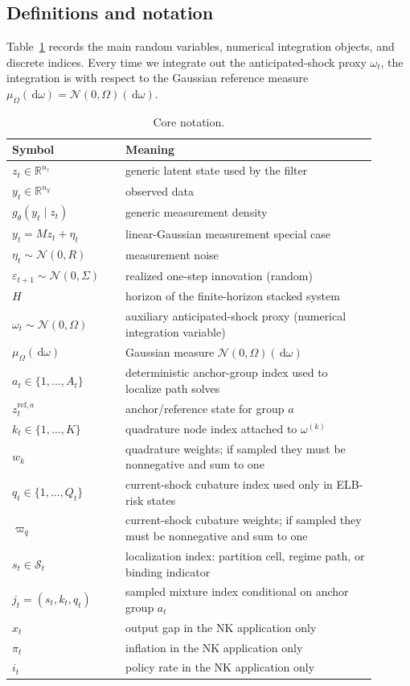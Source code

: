 \documentclass[11pt]{article}
\theoremstyle{remark}
\newcommand{\R}{\mathbb{R}}
\newcommand{\dd}{\,\mathrm{d}}
\begin{document}
\subsection{Definitions and notation}

Table~\ref{tab:notation} records the main random variables, numerical integration objects, and discrete indices.
Every time we integrate out the anticipated-shock proxy $\omega_t$, the integration is with respect to the Gaussian reference measure $\mu_\Omega(\dd\omega)=\mathcal{N}(0,\Omega)(\dd\omega)$.

\begin{table}[t]
\centering
\begin{tabular}{p{0.28\linewidth} p{0.62\linewidth}}
\toprule
Symbol & Meaning \\
\midrule
$z_t\in\R^{n_z}$ & generic latent state used by the filter \\
$y_t\in\R^{n_y}$ & observed data \\
$g_\theta(y_t\mid z_t)$ & generic measurement density \\
$y_t = M z_t + \eta_t$ & linear-Gaussian measurement special case \\
$\eta_t\sim \mathcal{N}(0,R)$ & measurement noise \\
$\varepsilon_{t+1}\sim \mathcal{N}(0,\Sigma)$ & realized one-step innovation (random) \\
$H$ & horizon of the finite-horizon stacked system \\
$\omega_t\sim\mathcal{N}(0,\Omega)$ & auxiliary anticipated-shock proxy (numerical integration variable) \\
$\mu_\Omega(\dd\omega)$ & Gaussian measure $\mathcal{N}(0,\Omega)(\dd\omega)$ \\
$a_t\in\{1,\ldots,A_t\}$ & deterministic anchor-group index used to localize path solves \\
$z_t^{\mathrm{ref},a}$ & anchor/reference state for group $a$ \\
$k_t\in\{1,\ldots,K\}$ & quadrature node index attached to $\omega^{(k)}$ \\
$w_k$ & quadrature weights; if sampled they must be nonnegative and sum to one \\
$q_t\in\{1,\ldots,Q_t\}$ & current-shock cubature index used only in ELB-risk states \\
$\varpi_q$ & current-shock cubature weights; if sampled they must be nonnegative and sum to one \\
$s_t\in\mathcal{S}_t$ & localization index: partition cell, regime path, or binding indicator \\
$j_t=(s_t,k_t,q_t)$ & sampled mixture index conditional on anchor group $a_t$ \\
$x_t$ & output gap in the NK application only \\
$\pi_t$ & inflation in the NK application only \\
$i_t$ & policy rate in the NK application only \\
\bottomrule
\end{tabular}
\caption{Core notation.}
\label{tab:notation}
\end{table}
\end{document}
